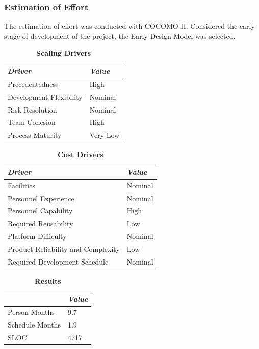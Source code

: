 \documentclass[conference,12pt]{IEEETran}
\begin{document}
\subsubsection{Estimation of Effort}
The estimation of effort was conducted with COCOMO II. Considered the 
early stage of development of the project, the Early Design Model was selected.\\

\begin{table}[!h]
	\centering
	\caption{\textbf{Scaling Drivers}}
	{\renewcommand{\arraystretch}{1.1}%
	\begin{tabular}{|l|l|}
		\hline
		\textit{Driver} & \textit{Value} \\
		\hline
		Precedentedness & High \\
		\hline
		Development Flexibility & Nominal \\
		\hline
		Risk Resolution & Nominal \\
		\hline
		Team Cohesion & High \\
		\hline
		Process Maturity & Very Low \\
		\hline
	\end{tabular}}
\end{table}

\begin{table}[!h]
	\centering
	\caption{\textbf{Cost Drivers}}
	{\renewcommand{\arraystretch}{1.1}%
	\begin{tabular}{|l|l|}
		\hline
		\textit{Driver} & \textit{Value} \\
		\hline
		Facilities & Nominal \\
		\hline
		Personnel Experience & Nominal \\
		\hline
		Personnel Capability & High \\
		\hline
		Required Reusability & Low \\
		\hline
		Platform Difficulty & Nominal \\
		\hline
		Product Reliability and Complexity & Low \\
		\hline
		Required Development Schedule & Nominal \\
		\hline
	\end{tabular}}
\end{table}

\begin{table}[!h]
	\centering
	\caption{\textbf{Results}}
	{\renewcommand{\arraystretch}{1.1}%
	\begin{tabular}{|l|l|}
		\hline
		& \textit{Value} \\
		\hline
		Person-Months & 9.7 \\
		\hline
		Schedule Months & 1.9 \\
		\hline
		SLOC & 4717 \\
		\hline
	\end{tabular}}
\end{table}
\end{document}
